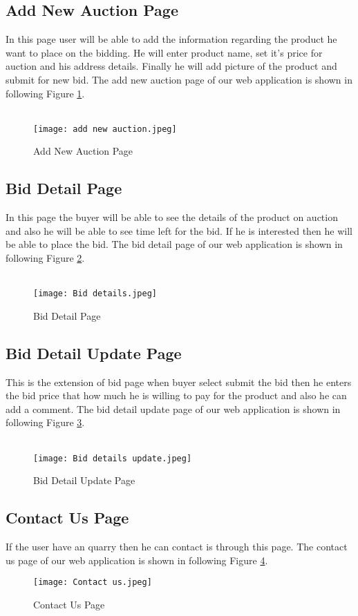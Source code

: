 \subsection{Add New Auction Page}
In this page user will be able to add the information regarding the product he want to place on the bidding. He will enter product name, set it's price for auction and his address details. Finally he will add picture of the product and submit for new bid. The add new auction page of our web application is shown in following Figure \ref{ano}.\\\\
\begin{figure}[!h]
    \centering
    \texttt{[image: add new auction.jpeg]}
    \caption{Add New Auction Page}
    \label{ano}
\end{figure}
\newpage
\subsection{Bid Detail Page}
In this page the buyer will be able to see the details of the product on auction and also he will be able to see time left for the bid. If he is interested then he will be able to place the bid. The bid detail page of our web application is shown in following Figure \ref{bdp}.\\\\
\begin{figure}[!h]
    \centering
    \texttt{[image: Bid details.jpeg]}
    \caption{Bid Detail Page}
    \label{bdp}
\end{figure}
\newpage
\subsection{Bid Detail Update Page}
This is the extension of bid page when buyer select submit the bid then he enters the bid price that how much he is willing to pay for the product and also he can add a comment. The bid detail update page of our web application is shown in following Figure \ref{dbuo}.\\\\
\begin{figure}[!h]
    \centering
    \texttt{[image: Bid details update.jpeg]}
    \caption{Bid Detail Update Page}
    \label{dbuo}
\end{figure}
\newpage
\subsection{Contact Us Page}
If the user have an quarry then he can contact is through this page. The contact us page of our web application is shown in following Figure \ref{cu}.
\begin{figure}[!h]
    \centering
    \texttt{[image: Contact us.jpeg]}
    \caption{Contact Us Page}
    \label{cu}
\end{figure}